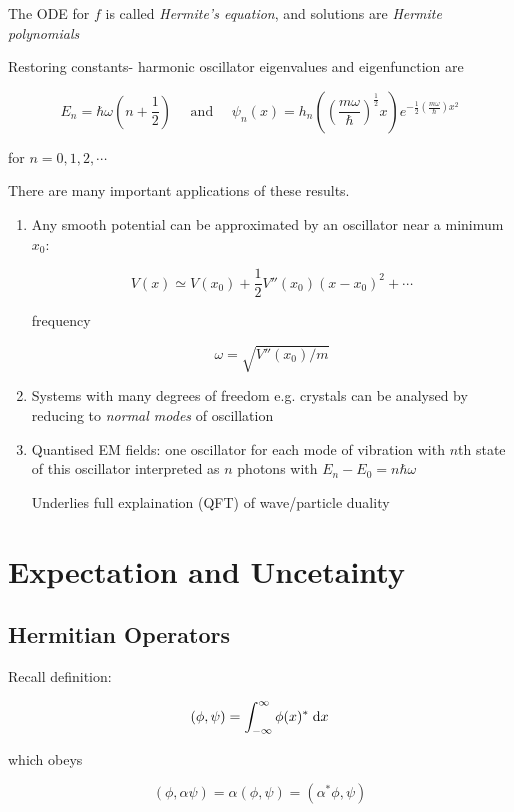\documentclass[a4paper]{article}
\begin{document}
The ODE for $ f $ is called \emph{Hermite's equation}, and solutions are \emph{Hermite polynomials}

Restoring constants- harmonic oscillator eigenvalues and eigenfunction are

\[ E_{n} = \hbar \omega  (n + \frac{1}{2}) \quad \text{ and } \quad \psi_{n}(x) = h_{n} \left(  \left(\frac{m \omega}{\hbar}   \right)^{\frac{1}{2}}  x \right)  e^{-\frac{1}{2} \left( \frac{m \omega}{\hbar} \right) x^{2} }     \]

for $ n = 0,1,2,\cdots $

There are many important applications of these results.

\begin{enumerate}
	\item Any smooth potential can be approximated by an oscillator near a minimum $ x_{0} $:
	
	\[ V(x) \simeq V(x_{0}) + \frac{1}{2} V''(x_{0}) (x - x_{0})^{2} + \cdots \]
	
	frequency
	
	\[ \omega = \sqrt{V''(x_{0}) / m} \]
	
	\item Systems with many degrees of freedom e.g. crystals can be analysed by reducing to \emph{normal modes} of oscillation
	
	\item Quantised EM fields: one oscillator for each mode of vibration with $ n $th state of this oscillator interpreted as $ n $ photons with $ E_{n} - E_{0} = n \hbar \omega $
	
	Underlies full explaination (QFT) of wave/particle duality
	
\end{enumerate}


\section{Expectation and Uncetainty}

\subsection{Hermitian Operators}

Recall definition:

\[ (\phi,\psi)  = \int_{-\infty}^{\infty} \phi(x)^{*} \; \mathrm{d} x \]

which obeys

\[ (\phi,\alpha \psi) = \alpha (\phi,\psi) = (\alpha^{*} \phi,\psi ) \]
\end{document}
